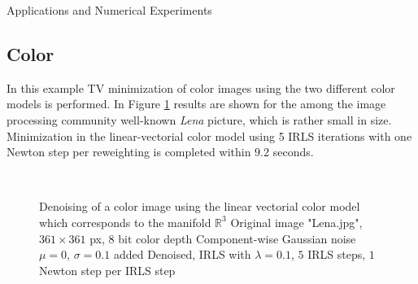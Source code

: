 \begin{chapter}{Applications and Numerical Experiments}
\FloatBarrier
\subsection{Color} %
\label{sub:Color}
In this example TV minimization of color images using the two different color models is performed. In Figure \ref{fig:application_color1} results are shown for the among the image processing community well-known \emph{Lena} picture, which is rather small in size. Minimization in
the linear-vectorial color model using 5 IRLS iterations with one Newton step per reweighting is completed within $9.2$ seconds.\\

\begin{figure}[h!]
    \centering
    \\
    \caption[Color image "Lena" linear vectorial denoising]{Denoising of a color image using the linear vectorial color model which corresponds to the manifold $\mathbb{R}^3$
	 Original image "Lena.jpg", $361\times 361$ px, 8 bit color depth
	 Component-wise Gaussian noise $\mu=0$, $\sigma=0.1$ added
	 Denoised, IRLS with $\lambda=0.1$, $5$ IRLS steps, $1$ Newton step per IRLS step
	\label{fig:application_color1}
    }
\end{figure}


\end{chapter}
